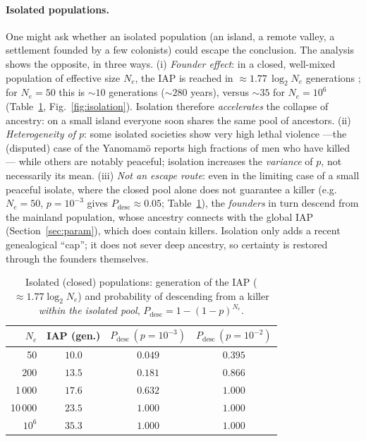 \documentclass[11pt]{article}
\begin{document}
\paragraph{Isolated populations.} One might ask whether an isolated population
(an island, a remote valley, a settlement founded by a few colonists) could
escape the conclusion. The analysis shows the opposite, in three ways. (i)
\emph{Founder effect}: in a closed, well-mixed population of effective size
$N_e$, the IAP is reached in $\approx 1{.}77\,\log_2 N_e$ generations
\citep{chang1999}; for $N_e=50$ this is $\sim 10$ generations ($\sim 280$ years),
versus $\sim 35$ for $N_e=10^{6}$ (Table~\ref{tab:island},
Fig.~\ref{fig:isolation}). Isolation therefore \emph{accelerates} the collapse of
ancestry: on a small island everyone soon shares the same pool of ancestors. (ii)
\emph{Heterogeneity of $p$}: some isolated societies show very high lethal
violence \citep{keeley1996} ---the (disputed) case of the Yanomam\"o reports high
fractions of men who have killed \citep{chagnon1988}--- while others are notably
peaceful; isolation increases the \emph{variance} of $p$, not necessarily its
mean. (iii) \emph{Not an escape route}: even in the limiting case of a small
peaceful isolate, where the closed pool alone does not guarantee a killer (e.g.\
$N_e=50$, $p=10^{-3}$ gives $P_{\text{desc}}\approx 0{.}05$;
Table~\ref{tab:island}), the \emph{founders} in turn descend from the mainland
population, whose ancestry connects with the global IAP
(Section~\ref{sec:param}), which does contain killers. Isolation only adds a
recent genealogical ``cap''; it does not sever deep ancestry, so certainty is
restored through the founders themselves.

\begin{table}[h]
\centering
\caption{Isolated (closed) populations: generation of the IAP
($\approx 1{.}77\log_2 N_e$) and probability of descending from a killer
\emph{within the isolated pool}, $P_{\text{desc}}=1-(1-p)^{N_e}$.}
\label{tab:island}
\begin{tabular}{rccc}
\toprule
$N_e$ & IAP (gen.) & $P_{\text{desc}}\,(p{=}10^{-3})$ & $P_{\text{desc}}\,(p{=}10^{-2})$ \\
\midrule
50      & $10{.}0$ & $0{.}049$ & $0{.}395$ \\
200     & $13{.}5$ & $0{.}181$ & $0{.}866$ \\
1\,000  & $17{.}6$ & $0{.}632$ & $1{.}000$ \\
10\,000 & $23{.}5$ & $1{.}000$ & $1{.}000$ \\
$10^{6}$ & $35{.}3$ & $1{.}000$ & $1{.}000$ \\
\bottomrule
\end{tabular}
\end{table}
\end{document}
